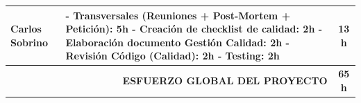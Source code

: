 \documentclass[12pt,a4paper,titlepage]{article}
\begin{document}
\begin{longtable}{@{}p{4.5cm} p{7.5cm} c@{}}
    \textbf{Carlos Sobrino} & 
    - Transversales (Reuniones + Post-Mortem + Petición): 5h \newline
    - Creación de checklist de calidad: 2h \newline
    - Elaboración documento Gestión Calidad: 2h \newline
    - Revisión Código (Calidad): 2h \newline
    - Testing: 2h & \textbf{13 h} \\ \midrule

    \multicolumn{2}{r}{\textbf{ESFUERZO GLOBAL DEL PROYECTO}} & \textbf{65 h} \\ 
\end{longtable}
\end{document}
